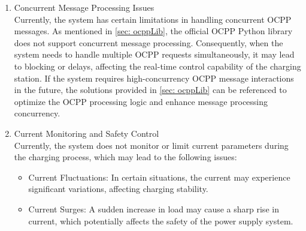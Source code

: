 \documentclass[
	english,
	ruledheaders=section,%
	class=report,%
	thesis={type=Report},%
	accentcolor=9c,%
	custommargins=true,%
	marginpar=false,%
	parskip=half-,%
	fontsize=11pt,%
	logofile={img/tuda_logo.pdf}, %
]{tudapub}
\begin{document}
\begin{enumerate}

\item Concurrent Message Processing Issues\\
Currently, the system has certain limitations in handling concurrent \ac{OCPP} messages. As mentioned in \autoref{sec: ocppLib}, the official \ac{OCPP} Python library does not  support concurrent message processing. Consequently, when the system needs to handle multiple \ac{OCPP} requests simultaneously, it may lead to blocking or delays, affecting the real-time control capability of the charging station. If the system requires high-concurrency \ac{OCPP} message interactions in the future, the solutions provided in \autoref{sec: ocppLib} can be referenced to optimize the \ac{OCPP} processing logic and enhance message processing concurrency.


    \item Current Monitoring and Safety Control\\
Currently, the system does not monitor or limit current parameters during the charging process, which may lead to the following issues:
    \begin{itemize}
        \item Current Fluctuations: In certain situations, the current may experience significant variations, affecting charging stability.
        \item Current Surges: A sudden increase in load may cause a sharp rise in current, which potentially affects the safety of the power supply system.
    \end{itemize}


\end{enumerate}
\end{document}

